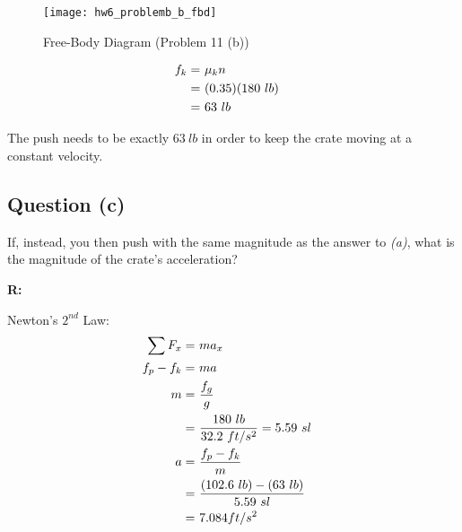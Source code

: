 		\begin{figure}[H]
			\begin{center}
				\texttt{[image: hw6\_problemb\_b\_fbd]}
				\caption{Free-Body Diagram (Problem 11 (b))}
				\label{fig:hw6_problemb_b_fbd}
			\end{center}
		\end{figure}

		\begin{align}
			f_{k} = \ &\mu_{k}n& \notag \\
			= \ &(0.35)(180 \ lb)& \notag \\
			= \ &63 \ lb&
		\end{align}

		The push needs to be exactly $63 \ lb$ in order to keep the crate moving at a constant velocity.

	\subsection{Question (c)}
		If, instead, you then push with the same magnitude as the answer to \emph{(a)}, what is the magnitude of the crate's acceleration?

		\textbf{R:} \newline

		Newton's $2^{nd}$ Law:
		\begin{align}
			\sum F_{x} = \ &ma_{x}& \notag \\
			f_{p}-f_{k} = \ &ma& \notag \\
			m = \ &\frac{f_{g}}{g}& \notag \\
			= \ &\frac{180 \ lb}{32.2 \ ft/s^{2}} = 5.59 \ sl& \notag \\
			a = \ &\frac{f_{p}-f_{k}}{m}& \notag \\
			= \ &\frac{(102.6 \ lb)-(63 \ lb)}{5.59 \ sl}& \notag \\
			= \ &7.084 ft/s^{2}&
		\end{align}
